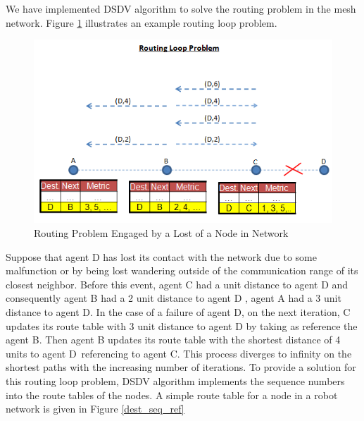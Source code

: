 We have implemented DSDV algorithm to solve the routing problem in the mesh network. Figure \ref{routing_problem2} illustrates an example routing loop problem.

\begin{figure}[H] 
\caption{Routing Problem Engaged by a Lost of a Node in Network} \label{routing_problem2}
\centering
\includegraphics[scale = 0.65]{routing_problem}
\end{figure}

Suppose that agent D has lost its contact with the network due to some malfunction or by being lost wandering outside of the communication range of its closest neighbor. Before this event, agent C had a unit distance to agent D and consequently agent B had a 2 unit distance to agent D , agent A had a 3 unit distance to agent D. In the case of a failure of agent D, on the next iteration, C updates its route table with 3 unit distance to agent D by taking as reference the agent B. Then agent B updates its route table with the shortest distance of 4 units to agent D\ referencing to agent C. This process diverges to infinity on the shortest paths with the increasing number of iterations. To provide a solution for this routing loop problem, DSDV algorithm implements the sequence numbers into the route tables of the nodes. A simple route table for a node in a robot network is given in Figure \ref{dest_seq_ref}

